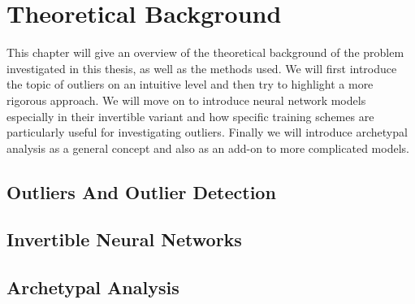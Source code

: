 \chapter{Theoretical Background}%
\label{cha:background}

This chapter will give an overview of the theoretical background of the problem
investigated in this thesis, as well as the methods used. We will first
introduce the topic of outliers on an intuitive level and then try to highlight
a more rigorous approach. We will move on to introduce neural network models
especially in their invertible variant and how specific training schemes are
particularly useful for investigating outliers. Finally we will introduce
archetypal analysis as a general concept and also as an add-on to more
complicated models.


\section{Outliers And Outlier Detection}%
\label{sec:outliers_an_outlier_detection}


\section{Invertible Neural Networks}%
\label{sec:invertible_neural_networks}


\section{Archetypal Analysis}%
\label{sec:archetypal_analysis}
